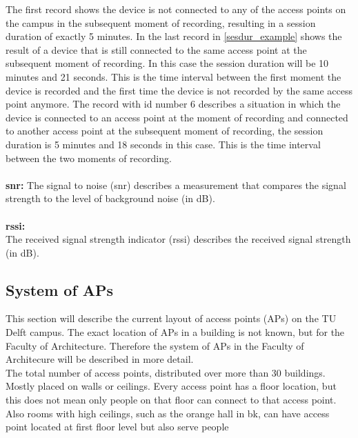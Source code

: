                                                                                                                                                                                                                                                                                                                                                                                                                                                                                                                                                                                                                                                                                                                                                                                                                                                    
The first record shows the device is not connected to any of the access points on the campus in the subsequent moment of recording, resulting in a session duration of exactly 5 minutes. In the last record in \autoref{sesdur_example} shows the result of a device that is still connected to the same access point at the subsequent moment of recording. In this case the session duration will be 10 minutes and 21 seconds. This is the time interval between the first moment the device is recorded and the first time the device is not recorded by the same access point anymore. The record with id number 6 describes a situation in which the device is connected to an access point at the moment of recording and connected to another access point at the subsequent moment of recording, the session duration is 5 minutes and 18 seconds in this case. This is the time interval between the two moments of recording.\\\\

\textbf{snr:}
The signal to noise (snr) describes a measurement that compares the signal strength to the level of background noise (in dB).\\\\
\textbf{rssi:} \\
The received signal strength indicator (rssi) describes the received signal strength (in dB).

\subsection{System of APs}\label{systemofaps}
This section will describe the current layout of access points (APs) on the TU Delft campus. The exact location of APs in a building is not known, but for the Faculty of Architecture. Therefore the system of APs in the Faculty of Architecure will be described in more detail. 
\\
The total number of access points, distributed over more than 30 buildings. 
Mostly placed on walls or ceilings. Every access point has a floor location, but this does not mean only people on that floor can connect to that access point. Also rooms with high ceilings, such as the orange hall in bk, can have access point located at first floor level but also serve people 


